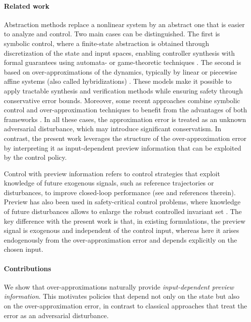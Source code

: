 \documentclass[letterpaper, 10 pt, conference]{ieeeconf}  %
\begin{document}
\paragraph{Related work}
Abstraction methods replace a nonlinear system by an abstract one that is easier to analyze and control. Two main cases can be distinguished. The first is symbolic control, where a finite-state abstraction is obtained through discretization of the state and input spaces, enabling controller synthesis with formal guarantees using automata- or game-theoretic techniques \cite{reissig2016feedback, belta2017formal, liu2014abstraction}. The second is based on over-approximations of the dynamics, typically by linear or piecewise affine systems (also called hybridizations) \cite{althoff2008reachability, girard2011synthesis}. These models make it possible to apply tractable synthesis and verification methods while ensuring safety through conservative error bounds. Moreover, some recent approaches combine symbolic control and over-approximation techniques to benefit from the advantages of both frameworks \cite{calbert2024smart}. In all these cases, the approximation error is treated as an unknown adversarial disturbance, which may introduce significant conservatism. In contrast, the present work leverages the structure of the over-approximation error by interpreting it as input-dependent preview information that can be exploited by the control policy.

Control with preview information refers to control strategies that exploit knowledge of future exogenous signals, such as reference trajectories or disturbances, to improve closed-loop performance (see \cite{birla2015optimal} and references therein). Preview has also been used in safety-critical control problems, where knowledge of future disturbances allows to enlarge the robust controlled invariant set \cite{liu2024quantifying}. The key difference with the present work is that, in existing formulations, the preview signal is exogenous and independent of the control input, whereas here it arises endogenously from the over-approximation error and depends explicitly on the chosen input.

\paragraph{Contributions}

We show that over-approximations naturally provide \emph{input-dependent preview information}. This motivates policies that depend not only on the state but also on the over-approximation error, in contrast to classical approaches that treat the error as an adversarial disturbance.
\end{document}
